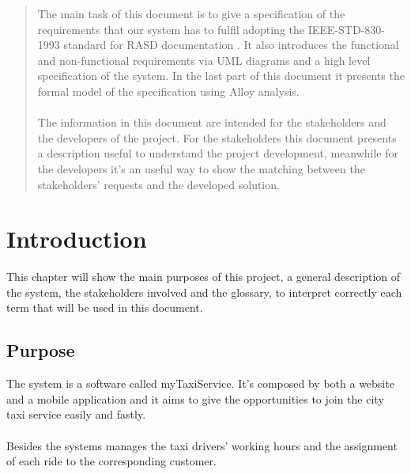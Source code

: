 
\begin{abstract}
The main task of this document is to give a specification of the requirements that our system has to fulfil adopting the IEEE-STD-830-1993 standard for RASD documentation . It also introduces the functional and non-functional requirements via UML diagrams and a high level specification of the system. In the last part of this document it presents the formal model of the specification using Alloy analysis.\\
\\
The information in this document are intended for the stakeholders and the developers of the project. For the stakeholders this document presents a description useful to understand the project development, meanwhile for the developers it's an useful way to show the matching between the stakeholders' requests and the developed solution. 
\end{abstract} 

\chapter{Introduction}

\setmyfancystyle

\label{intro}
This chapter will show the main purposes of this project, a general description of the system, the stakeholders involved and the glossary, to interpret correctly each term that will be used in this document.

\section{Purpose}
The system is a software called myTaxiService. It's composed by both a website and a mobile application and it aims to give the opportunities to join the city taxi service easily and fastly.\\
\\
Besides the systems manages the taxi drivers' working hours and the assignment of each ride to the corresponding customer.

